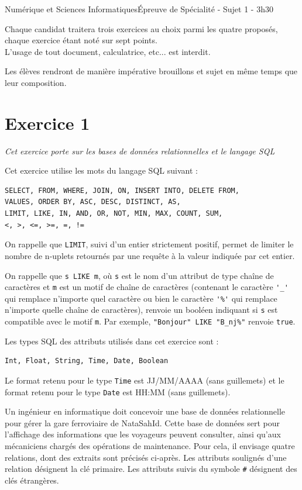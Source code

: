 \documentclass[11pt,a4paper,french,twoside]{PMCours}
\begin{document}
{Numérique et Sciences Informatiques}{Épreuve de Spécialité - Sujet 1 - 3h30}

\medskip
{\large Chaque candidat traitera trois exercices au choix parmi les quatre proposés, chaque exercice étant noté sur sept points.\medskip\\
L'usage de tout document, calculatrice, etc... est interdit.

\medskip
Les élèves rendront de manière impérative brouillons et sujet en même temps que leur composition.}

\newpage
\section*{Exercice 1}
\emph{Cet exercice porte sur les bases de données relationnelles et le langage SQL}

\medskip
Cet exercice utilise les mots du langage SQL suivant :
\begin{verbatim}
SELECT, FROM, WHERE, JOIN, ON, INSERT INTO, DELETE FROM, 
VALUES, ORDER BY, ASC, DESC, DISTINCT, AS,
LIMIT, LIKE, IN, AND, OR, NOT, MIN, MAX, COUNT, SUM,
<, >, <=, >=, =, !=
\end{verbatim} 
On rappelle que \verb'LIMIT', suivi d'un entier strictement positif, permet de limiter le nombre de n-uplets retournés par une requête à la valeur indiquée par cet entier. 

On rappelle que \verb's LIKE m', où \verb's' est le nom d'un attribut de type chaîne de caractères et \verb'm' est un motif de chaîne de caractères (contenant le caractère \verb"'_'" qui remplace n'importe quel caractère ou bien le caractère \verb"'%'" qui remplace n'importe quelle chaîne de caractères), renvoie un booléen indiquant si \verb's' est compatible avec le motif \verb'm'. Par exemple, \verb'"Bonjour" LIKE "B_nj%"' renvoie \verb'true'.

Les types SQL des attributs utilisés dans cet exercice sont : 
\begin{verbatim}
Int, Float, String, Time, Date, Boolean
\end{verbatim} 
Le format retenu pour le type \verb'Time' est JJ/MM/AAAA (sans guillemets) et 
le format retenu pour le type \verb'Date' est HH:MM (sans guillemets).

\medskip
Un ingénieur en informatique doit concevoir une base de données relationnelle pour gérer la gare ferroviaire de NataSahId. Cette base de données sert pour l'affichage des informations  que les voyageurs peuvent consulter, ainsi qu'aux mécaniciens chargés des opérations de maintenance. Pour cela, il envisage quatre relations, dont des extraits sont précisés ci-après. Les attributs soulignés d'une relation désignent la clé primaire. Les attributs suivis du symbole \verb'#' désignent des clés étrangères.
\end{document}
